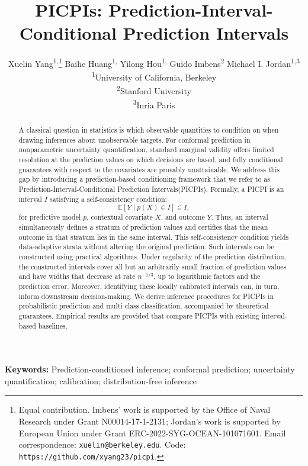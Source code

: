 \documentclass[11pt]{article}
\title{PICPIs: Prediction-Interval-Conditional Prediction Intervals}
\author[{}]{%
  Xuelin Yang\textsuperscript{1,}\thanks{Equal contribution. Imbens' work is supported by the Office of Naval Research under Grant N00014-17-1-2131; Jordan’s work is supported by European Union under Grant ERC-2022-SYG-OCEAN-101071601. Email correspondence: \texttt{xuelin@berkeley.edu}.  Code: \texttt{https://github.com/xyang23/picpi}.}\qquad
  Baihe Huang\textsuperscript{1,}\protect\footnotemark[1]\qquad
  Yilong Hou\textsuperscript{1,}\protect\footnotemark[1]\authorcr
  Guido Imbens\textsuperscript{2} \qquad
  Michael I. Jordan\textsuperscript{1,}\textsuperscript{3}\\
  {\Affilfont
    \textsuperscript{1}University of California, Berkeley\\
    \textsuperscript{2}Stanford University\\
    \textsuperscript{3}Inria Paris}
}
\date{}
\theoremstyle{statplain}
\theoremstyle{statdefinition}
\newcommand{\E}{\mathbb{E}}
\newcommand{\0}{\mathbf{0}}
\newcommand{\titleShort}{PICPI\xspace}
\newcommand{\titleNames}{Prediction-Interval-Conditional Prediction Intervals\xspace}
\newcommand{\titleShorts}{PICPIs\xspace}
\begin{document}
\maketitle
\begin{abstract}
A classical question in statistics is which observable quantities to
condition on when drawing inferences about unobservable targets.
For conformal prediction in nonparametric uncertainty quantification, standard marginal validity offers limited resolution at the prediction values on which decisions are based, and fully conditional guarantees with respect to the covariates are provably unattainable. 
We address this gap by introducing a prediction-based conditioning framework that we refer to as \titleNames (\titleShorts). Formally,  a \titleShort is an interval $I$ satisfying a self-consistency condition:
$$ \E [ Y\mid p(X) \in I] \in I,$$
for predictive model $p$, contextual covariate $X$, and outcome $Y$.
Thus, an interval simultaneously defines a stratum of prediction values and certifies that the mean outcome in that stratum lies in the same interval.
This self-consistency condition yields data-adaptive strata without altering the original prediction.
Such intervals can be constructed using practical algorithms.  
Under regularity of the prediction distribution, the constructed intervals cover all but an arbitrarily small fraction of prediction values and have widths that decrease at rate $n^{-1/3}$, up to logarithmic factors and the prediction error.
Moreover, identifying these locally calibrated intervals can, in turn, inform downstream decision-making.
We derive inference procedures for \titleShorts in probabilistic prediction and multi-class classification, accompanied by theoretical guarantees.
Empirical results are provided that compare \titleShorts with existing interval-based baselines.


\end{abstract}
\noindent\textbf{Keywords:} Prediction-conditioned inference; conformal prediction; uncertainty quantification; calibration; distribution-free inference
\end{document}
